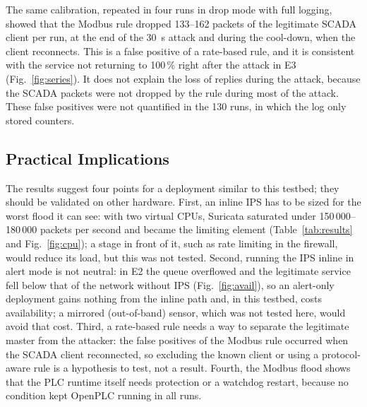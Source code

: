 The same calibration, repeated in four runs in drop mode with full logging, showed that the Modbus rule dropped 133--162 packets of the legitimate SCADA client per run, at the end of the 30~s attack and during the cool-down, when the client reconnects. This is a false positive of a rate-based rule, and it is consistent with the service not returning to 100\,\% right after the attack in E3 (Fig.~\ref{fig:series}). It does not explain the loss of replies during the attack, because the SCADA packets were not dropped by the rule during most of the attack. These false positives were not quantified in the 130 runs, in which the log only stored counters.

\subsection{Practical Implications}
The results suggest four points for a deployment similar to this testbed; they should be validated on other hardware. First, an inline IPS has to be sized for the worst flood it can see: with two virtual CPUs, Suricata saturated under 150\,000--180\,000 packets per second and became the limiting element (Table~\ref{tab:results} and Fig.~\ref{fig:cpu}); a stage in front of it, such as rate limiting in the firewall, would reduce its load, but this was not tested. Second, running the IPS inline in alert mode is not neutral: in E2 the queue overflowed and the legitimate service fell below that of the network without IPS (Fig.~\ref{fig:avail}), so an alert-only deployment gains nothing from the inline path and, in this testbed, costs availability; a mirrored (out-of-band) sensor, which was not tested here, would avoid that cost. Third, a rate-based rule needs a way to separate the legitimate master from the attacker: the false positives of the Modbus rule occurred when the SCADA client reconnected, so excluding the known client or using a protocol-aware rule is a hypothesis to test, not a result. Fourth, the Modbus flood shows that the PLC runtime itself needs protection or a watchdog restart, because no condition kept OpenPLC running in all runs.

